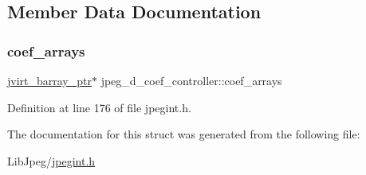 \subsection{Member Data Documentation}
\mbox{\label{structjpeg__d__coef__controller_a6611f9e18fbbbb13d117caadb5d14dc1}} 
\subsubsection{\texorpdfstring{coef\_arrays}{coef\_arrays}}
{\footnotesize\ttfamily \mbox{\hyperlink{jpeglib_8h_a994f4cba141d82ded90af38e51223f0b}{jvirt\+\_\+barray\+\_\+ptr}}$\ast$ jpeg\+\_\+d\+\_\+coef\+\_\+controller\+::coef\+\_\+arrays}



Definition at line 176 of file jpegint.\+h.



The documentation for this struct was generated from the following file\+:\begin{DoxyCompactItemize}
\item 
Lib\+Jpeg/\mbox{\hyperlink{jpegint_8h}{jpegint.\+h}}\end{DoxyCompactItemize}
